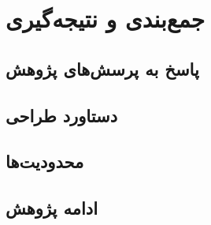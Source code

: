 \chapter{جمع‌بندی و نتیجه‌گیری}

\label{chap:conclusion}

\section{پاسخ به پرسش‌های پژوهش}

\section{دستاورد طراحی}

\section{محدودیت‌ها}

\section{ادامه پژوهش}
